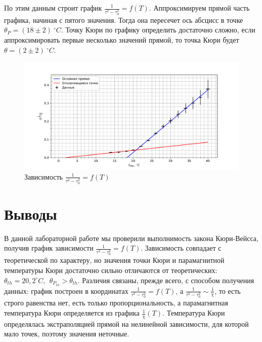 \documentclass[a4paper, 12pt]{article}
\begin{document}
	По этим данным строит график $\frac{1}{\tau^2 - \tau_0^2} = f(T)$. Аппроксимируем прямой часть графика, начиная с пятого значения. Тогда она пересечет ось абсцисс в точке $\theta_P = (18 \pm 2)\ ^{\circ}C$.
	Точку Кюри по графику определить достаточно сложно, если аппроксимировать первые несколько значений прямой, то точка Кюри будет $\theta = (2 \pm 2)\ ^{\circ}C$.
	\begin{figure}[H]
		\centering
		\includegraphics[width = \textwidth]{graph.pdf}
		\caption{Зависимость $\frac{1}{\tau^2 - \tau_0^2} = f(T)$}
	\end{figure}
	\section*{Выводы}
	В данной лабораторной работе мы проверили выполнимость закона Кюри-Вейсса, получив график зависимости $\frac{1}{\tau^2 - \tau_0^2} = f(T)$. Зависимость совпадает с теоретической по характеру, но значения точки Кюри и парамагнитной температуры Кюри достаточно сильно отличаются от теоретических: $\theta_{th} = 20,2^{\circ}C, \ \ \theta_{P_{th}} > \theta_{th}$. Различия связаны, прежде всего, с способом получения данных: график построен в координатах $\frac{1}{\tau^2 - \tau_0^2} = f(T)$, а $\frac{1}{\tau^2 - \tau_0^2} \sim \frac{1}{\chi}$, то есть строго равенства нет, есть только пропорциональность, а парамагнитная температура Кюри определяется из графика $\frac{1}{\chi}(T)$. Температура Кюри определялась экстраполяцией прямой на нелинейной зависимости, для которой мало точек, поэтому значения неточные.
\end{document}
